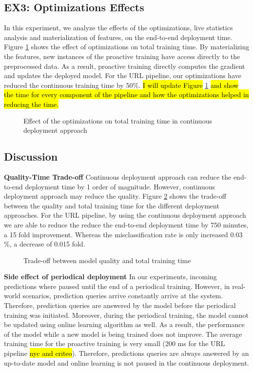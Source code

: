 \subsection{EX3: Optimizations Effects}
In this experiment, we analyze the effects of the optimizations, live statistics analysis and materialization of features, on the end-to-end deployment time.
Figure \ref{optimization-effect} shows the effect of optimizations on total training time.
By materializing the features, new instances of the proactive training have access directly to the preprocessed data.
As a result, proactive training directly computes the gradient and updates the deployed model.
For the URL pipeline, our optimizations have reduced the continuous training time by 50\%.
\hl{I will update Figure} \ref{optimization-effect} \hl{and show the time for every component of the pipeline and how the optimizations helped in reducing the time.}
\begin{figure}[h!]
\centering
\resizebox{\columnwidth}{!}{}
\caption{Effect of the optimizations on total training time in continuous deployment approach}
\label{optimization-effect}
\end{figure}

\subsection{Discussion} \label{subsec:discussion}
\textbf{Quality-Time Trade-off}
Continuous deployment approach can reduce the end-to-end deployment time by 1 order of magnitude.
However, continuous deployment approach may reduce the quality.
Figure \ref{quality-vs-time} shows the trade-off between the quality and total training time for the different deployment approaches.
For the URL pipeline, by using the continuous deployment approach we are able to reduce the reduce the end-to-end deployment time by 750 minutes, a 15 fold improvement.
Whereas the misclassification rate is only increased 0.03 \%, a decrease of 0.015 fold.

\begin{figure}[!h]
\centering
\resizebox{\columnwidth}{!}{}
\caption{Trade-off between model quality and total training time}
\label{quality-vs-time}
\end{figure}


\textbf{Side effect of periodical deployment}
In our experiments, incoming predictions where paused until the end of a periodical training.
However, in real-world scenarios, prediction queries arrive constantly arrive at the system.
Therefore, prediction queries are answered by the model before the periodical training was initiated. 
Moreover, during the periodical training, the model cannot be updated using online learning algorithm as well.
As a result, the performance of the model while a new model is being trained does not improve.
The average training time for the proactive training is very small (200 ms for the URL pipeline \hl{nyc and criteo}).
Therefore, predictions queries are always answered by an up-to-date model and online learning is not paused in the continuous deployment.



